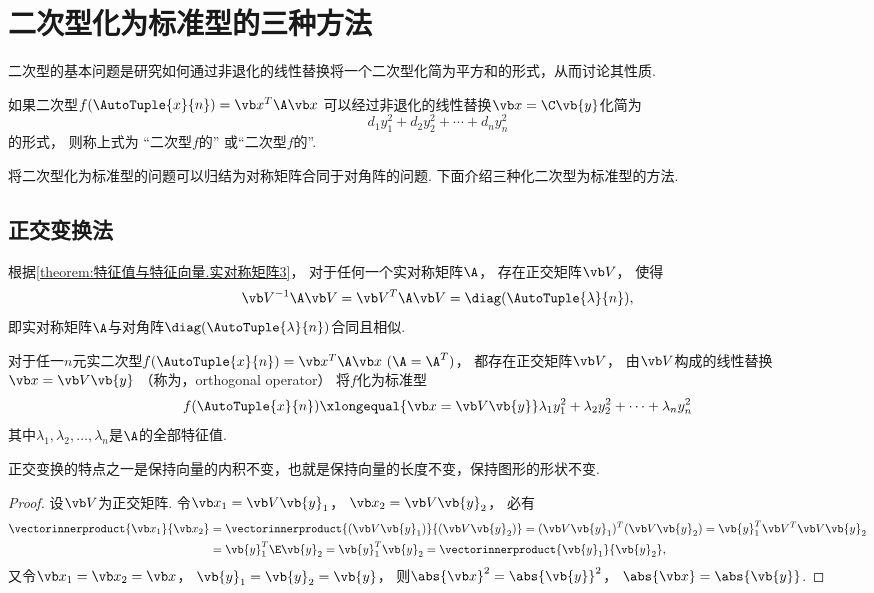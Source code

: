 \section{二次型化为标准型的三种方法}
二次型的基本问题是研究如何通过非退化的线性替换将一个二次型化简为平方和的形式，从而讨论其性质.

\begin{definition}
如果二次型\(f(\AutoTuple{x}{n})=\x^T\A\x\)
可以经过非退化的线性替换\(\x = \C \vb{y}\)化简为\[
	d_1 y_1^2 + d_2 y_2^2 + \dotsb + d_n y_n^2
\]的形式，
则称上式为
“二次型\(f\)的”
或“二次型\(f\)的”.
\end{definition}
将二次型化为标准型的问题可以归结为对称矩阵合同于对角阵的问题.
下面介绍三种化二次型为标准型的方法.

\subsection{正交变换法}
根据\cref{theorem:特征值与特征向量.实对称矩阵3}，
对于任何一个实对称矩阵\(\A\)，
存在正交矩阵\(\Q\)，
使得\[
	\Q^{-1}\A\Q = \Q^T\A\Q = \diag(\AutoTuple{\lambda}{n}),
\]
即实对称矩阵\(\A\)与对角阵\(\diag(\AutoTuple{\lambda}{n})\)合同且相似.

\begin{theorem}
对于任一\(n\)元实二次型\(f(\AutoTuple{x}{n})=\x^T\A\x\ (\A=\A^T)\)，
都存在正交矩阵\(\Q\)，
由\(\Q\)构成的线性替换\(\x=\Q\vb{y}\)
（称为，{\rm orthogonal operator}）
将\(f\)化为标准型\[
	f(\AutoTuple{x}{n})
	\xlongequal{\x=\Q\vb{y}}
	\lambda_1y_1^2+\lambda_2y_2^2+ \dotsb +\lambda_ny_n^2
\]
其中\(\lambda_1,\lambda_2,\dotsc,\lambda_n\)是\(\A\)的全部特征值.
\end{theorem}

\begin{corollary}
正交变换的特点之一是保持向量的内积不变，也就是保持向量的长度不变，保持图形的形状不变.
\begin{proof}
设\(\Q\)为正交矩阵.
令\(\x_1=\Q\vb{y}_1\)，
\(\x_2=\Q\vb{y}_2\)，
必有\begin{align*}
	\vectorinnerproduct{\x_1}{\x_2}
	&=\vectorinnerproduct{(\Q\vb{y}_1)}{(\Q\vb{y}_2)}
	=(\Q\vb{y}_1)^T (\Q\vb{y}_2)
	=\vb{y}_1^T \Q^T \Q \vb{y}_2 \\
	&=\vb{y}_1^T \E \vb{y}_2
	=\vb{y}_1^T \vb{y}_2
	=\vectorinnerproduct{\vb{y}_1}{\vb{y}_2},
\end{align*}
又令\(\x_1=\x_2=\x\)，
\(\vb{y}_1=\vb{y}_2=\vb{y}\)，
则\(\abs{\x}^2=\abs{\vb{y}}^2\)，
\(\abs{\x}=\abs{\vb{y}}\).
\end{proof}
\end{corollary}

